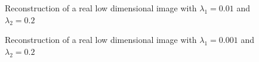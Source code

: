 \documentclass[a4paper,11pt,oneside]{report}
\theoremstyle{named}
\begin{document}
\begin{figure}
    \centering
    \caption{Reconstruction of a real low dimensional image with $\lambda_1 = 0.01$ and $\lambda_2 = 0.2$}
    \label{fig:h1}
\end{figure}

\begin{figure}
    \centering
    \caption{Reconstruction of a real low dimensional image with $\lambda_1 = 0.001$ and $\lambda_2 = 0.2$}
    \label{fig:h2}
\end{figure}
\end{document}
